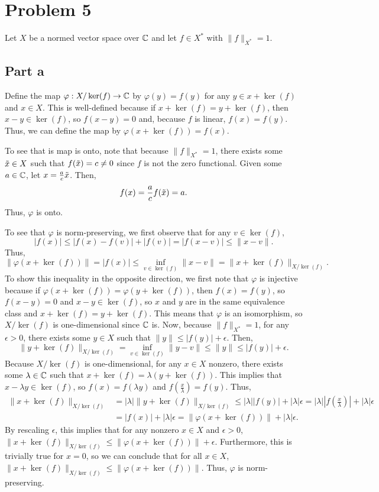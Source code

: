 \documentclass{article}
\begin{document}
\section{Problem 5}
Let $X$ be a normed vector space over $\mathbb{C}$ and let $f\in X^*$ with $\|f\|_{X^*}=1$. 
\subsection{Part a}
Define the map $\varphi:X/\ker(f)\to\mathbb{C}$ by $\varphi(y)=f(y)$ for any $y\in x+\ker(f)$ and $x\in X$. This is well-defined because if $x+\ker(f)=y+\ker(f)$, then $x-y\in\ker(f)$, so $f(x-y)=0$ and, because $f$ is linear, $f(x)=f(y)$. Thus, we can define the map by $\varphi(x+\ker(f))=f(x)$. 

To see that is map is onto, note that because $\|f\|_{X^*}=1$, there exists some $\Tilde x\in X$ such that $f(\Tilde x)=c\neq 0$ since $f$ is not the zero functional. Given some $a\in\mathbb{C}$, let $x=\frac{a}{c}\Tilde x$. Then,
\[
f(x)=\frac{a}{c}f(\Tilde x)=a.
\]
Thus, $\varphi$ is onto. 

To see that $\varphi$ is norm-preserving, we first observe that for any $v\in\ker(f)$,
\[
|f(x)|\leq |f(x)-f(v)|+|f(v)|=|f(x-v)|\leq \|x-v\|.
\]
Thus,
\[
\|\varphi(x+\ker(f))\|=|f(x)|\leq\inf_{v\in\ker(f)}\|x-v\|=\|x+\ker(f)\|_{X/\ker(f)}.
\]
To show this inequality in the opposite direction, we first note that $\varphi$ is injective because if $\varphi(x+\ker(f))=\varphi(y+\ker(f))$, then $f(x)=f(y)$, so $f(x-y)=0$ and $x-y\in\ker(f)$, so $x$ and $y$ are in the same equivalence class and $x+\ker(f)=y+\ker(f)$. This means that $\varphi$ is an isomorphism, so $X/\ker(f)$ is one-dimensional since $\mathbb{C}$ is. Now, because $\|f\|_{X^*}=1$, for any $\epsilon>0$, there exists some $y\in X$ such that $\|y\|\leq|f(y)|+\epsilon$. Then,
\[
\|y+\ker(f)\|_{X/\ker(f)}=\inf_{v\in\ker(f)}\|y-v\|\leq\|y\|\leq|f(y)|+\epsilon. 
\]
Because $X/\ker(f)$ is one-dimensional, for any $x\in X$ nonzero, there exists some $\lambda\in\mathbb{C}$ such that $x+\ker(f)=\lambda(y+\ker(f))$. This implies that $x-\lambda y\in\ker(f)$, so $f(x)=f(\lambda y)$ and $f\left(\frac{x}{\lambda}\right)=f(y)$. Thus,
\begin{align*}
\|x+\ker(f)\|_{X/\ker(f)}&=|\lambda|\|y+\ker(f)\|_{X/\ker(f)}\leq|\lambda||f(y)|+|\lambda|\epsilon=|\lambda|\left|f\left(\frac{x}{\lambda}\right)\right|+|\lambda|\epsilon\\&=|f(x)|+|\lambda|\epsilon=\|\varphi(x+\ker(f))\|+|\lambda|\epsilon.
\end{align*}
By rescaling $\epsilon$, this implies that for any nonzero $x\in X$ and $\epsilon>0$, $\|x+\ker(f)\|_{X/\ker(f)}\leq \|\varphi(x+\ker(f))\|+\epsilon$. Furthermore, this is trivially true for $x=0$, so we can conclude that for all $x\in X$, $\|x+\ker(f)\|_{X/\ker(f)}\leq \|\varphi(x+\ker(f))\|$. Thus, $\varphi$ is norm-preserving.
\end{document}
